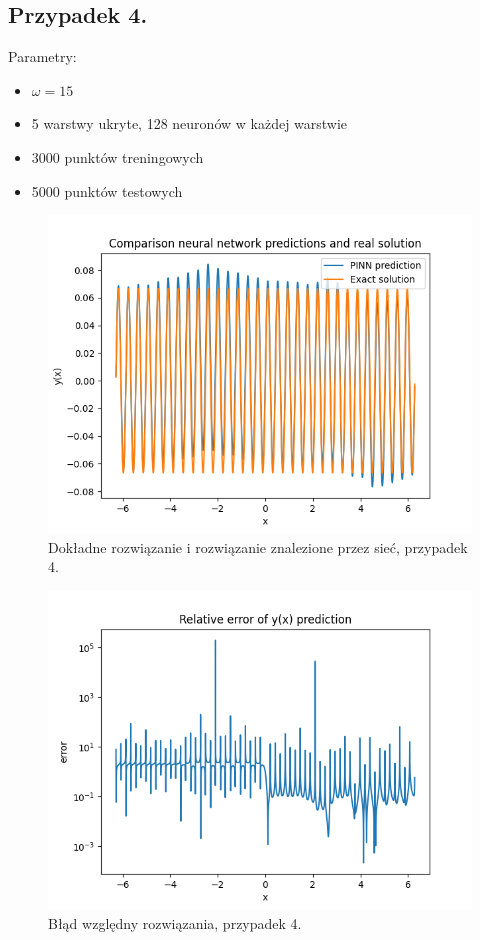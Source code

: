 \documentclass[11pt, leqno]{scrartcl}
\begin{document}
    \subsection{Przypadek 4.}
    Parametry:
    \begin{itemize}
        \item $\omega =15$
        \item 5 warstwy ukryte, 128 neuronów w każdej warstwie
        \item 3000 punktów treningowych
        \item 5000 punktów testowych
    \end{itemize}
    \begin{figure}[H]
        \centering
        \includegraphics[width=0.7\linewidth]{nn_b3_f.png}
        \caption{Dokładne rozwiązanie i rozwiązanie znalezione
            przez sieć, przypadek 4.}
    \end{figure}
    \begin{figure}[H]
        \centering
        \includegraphics[width=0.7\linewidth]{nn_b3_err.png}
        \caption{Błąd względny rozwiązania, przypadek 4.}
    \end{figure}
\end{document}
